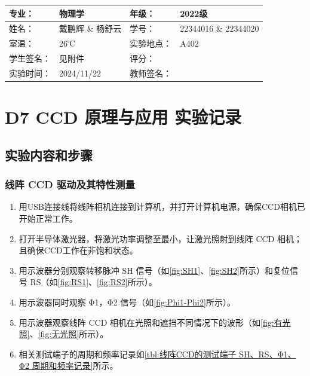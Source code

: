 \documentclass[dvipsnames, svgnames,a4paper,11pt]{article}
\begin{document}
\clearpage
\begin{table}
	\renewcommand\arraystretch{1.7}
	\centering
	\begin{tabularx}{\textwidth}{|X|X|X|X|}
	\hline
	专业：& 物理学 &年级：& 2022级 \\
	\hline
	姓名：& 戴鹏辉 \& 杨舒云 & 学号：& 22344016 \& 22344020 \\
	\hline
	室温：& 26℃ & 实验地点： & A402 \\
	\hline
	学生签名：& 见附件 & 评分： &\\
	\hline
	实验时间：& 2024/11/22 & 教师签名：&\\
	\hline
	\end{tabularx}
\end{table}

\section{D7 \quad CCD 原理与应用 \quad\heiti 实验记录}

\subsection{实验内容和步骤}

	\subsubsection{线阵 CCD 驱动及其特性测量}
		
		\begin{enumerate}
			\item 用USB连接线将线阵相机连接到计算机，并打开计算机电源，确保CCD相机已开始正常工作。
			\item 打开半导体激光器，将激光功率调整至最小，让激光照射到线阵 CCD 相机；且确保CCD工作在非饱和状态。
			\item 用示波器分别观察转移脉冲 SH 信号（如\cref{fig:SH1}、\cref{fig:SH2}所示）和复位信号 RS（如\cref{fig:RS1}、\cref{fig:RS2}所示）。
			\item 用示波器同时观察 Φ1，Φ2 信号（如\cref{fig:Phi1-Phi2}所示）。
			\item 用示波器观察线阵 CCD 相机在光照和遮挡不同情况下的波形（如\cref{fig:有光照}、\cref{fig:无光照}所示）。
			\item 相关测试端子的周期和频率记录如\cref{tbl:线阵CCD的测试端子 SH、RS、Φ1、Φ2 周期和频率记录}所示。
		\end{enumerate}

\end{document}
